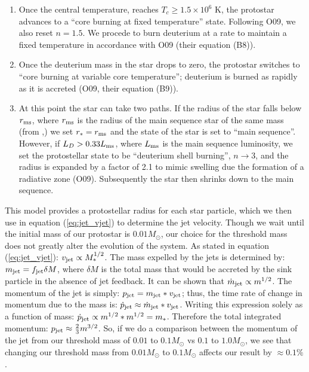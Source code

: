 \documentclass[../dissertation.tex]{subfiles}
\begin{document}
\begin{enumerate}
\item Once the central temperature, reaches $T_c \geq 1.5\times 10^6$ K, the protostar advances to a ``core burning at fixed temperature'' state.  Following O09, we also reset $n=1.5$.  We procede to burn deuterium at a rate to maintain a fixed temperature in accordance with O09 (their equation (B8)).
\item Once the deuterium mass in the star drops to zero, the protostar switches to ``core burning at variable core temperature''; deuterium is burned as rapidly as it is accreted (O09, their equation (B9)).
\item At this point the star can take two paths.
If the radius of the star falls below $r_{\rm ms}$, where $r_{\rm ms}$ is the radius of the main sequence star of the same mass (from \citet{1967CaJPh..45.3429E},) we set $r_*=r_{\rm ms}$ and the state of the star is set to ``main sequence''.
However, if $L_D > 0.33 L_{\rm ms}$, where $L_{\rm ms}$ is the main sequence luminosity, we set the protostellar state to be ``deuterium shell burning'', $n\rightarrow 3$, and the radius is expanded by a factor of 2.1 to mimic swelling due the formation of a radiative zone (O09).
Subsequently the star then shrinks down to the main sequence.
\end{enumerate}
This model provides a protostellar radius for each star particle, which we then use in equation (\ref{eq:jet_vjet}) to determine the jet velocity.
Though we wait until the initial mass of our protostar is $0.01 M_\odot$, our choice for the threshold mass does not greatly alter the evolution of the system.
As stated in equation (\ref{eq:jet_vjet}): $v_{\rm jet} \propto M_*^{1/2}$.
The mass expelled by the jets is determined by: $m_{\rm jet} = f_{\rm jet} \delta M$, where  $\delta M$ is the total mass that would be accreted by the sink particle in the absence of jet feedback. 
It can be shown that $\dot{m}_{\rm jet} \propto m^{1/2}$.
The momentum of the jet is simply: $p_{\rm jet} = m_{\rm jet} * v_{\rm jet}$; 
thus, the time rate of change in momentum due to the mass is: $\dot{p}_{\rm jet} \approx \dot{m}_{\rm jet} * v_{\rm jet}$.
Writing this expression solely as a function of mass: $\dot{p}_{\rm jet} \propto m^{1/2} * m^{1/2} = m_*$. 
Therefore the total integrated momentum: $p_{\rm jet} \approx \frac{2}{3} m^{3/2}$.
So, if we do a comparison between the momentum of the jet from our threshold mass of $0.01$ to $0.1 M_\odot$ vs $0.1$ to $1.0 M_\odot$, we see that changing our threshold mass from $0.01 M_\odot$ to $0.1 M_\odot$ affects our result by $\approx 0.1 \%$.
\end{document}
